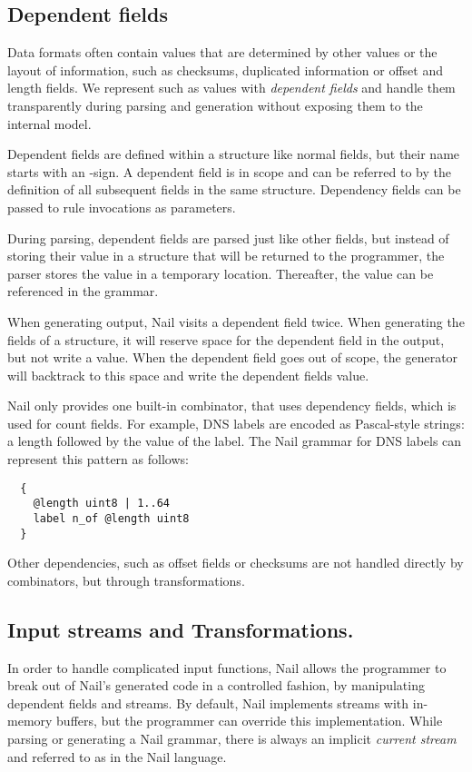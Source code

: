 \subsection{Dependent fields}

Data formats often contain values that are determined by other values or the layout of information,
such as checksums, duplicated information  or offset and  length fields.
We represent such as values with \emph{dependent fields} and handle them transparently during
parsing and generation without exposing them to the internal model. 


Dependent fields are defined within a structure like normal fields, but their name starts with an \@-sign. 
A dependent field is in scope and can be referred to by the definition of all subsequent fields in
the same structure. Dependency fields can be passed to rule invocations as parameters.

During parsing, dependent fields are parsed just like other fields, but instead of storing their
value in a structure that will be returned to the programmer, the parser stores the value in a
temporary location. Thereafter, the value can be referenced in the grammar. 

When generating output, Nail visits a dependent field twice. When generating the fields of a
structure, it will reserve space for the dependent field in the output, but not write a value. When
the dependent field goes out of scope, the generator will backtrack to this space and write the
dependent fields value.

Nail only provides one built-in combinator,  that uses dependency fields, which is used
for count fields. For example, DNS labels are encoded as Pascal-style strings: a length followed by
the value of the label. The Nail grammar for DNS labels can represent
this pattern as follows:

{
\smaller[0.5]
\begin{verbatim}
  {
    @length uint8 | 1..64
    label n_of @length uint8
  }
\end{verbatim}
}

Other dependencies, such as offset fields or checksums are not handled directly by combinators, but
through  transformations.

\subsection{Input streams and Transformations.}

In order to handle complicated input functions, Nail allows the programmer to
break out of Nail's generated code in a controlled fashion, by manipulating dependent fields and
streams. 
By default, Nail implements streams with in-memory buffers, but the programmer can override this implementation.
While parsing or generating a Nail grammar, there is always an implicit \emph{current stream} and
referred to as  in the Nail language.

